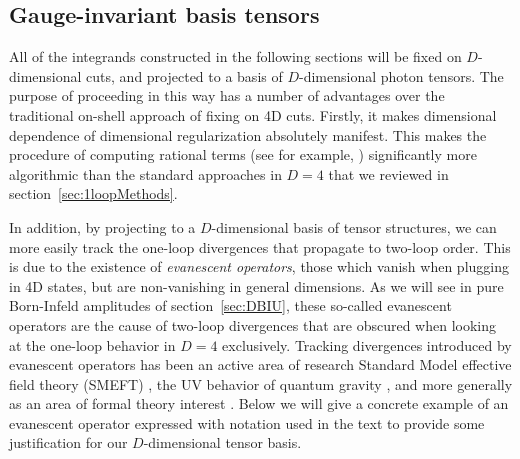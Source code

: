 \documentclass[12pt,letter]{article}
\def\sect#1{section~\ref{#1}}
\def\sec#1{section~\ref{#1}}
\begin{document}
\subsection{Gauge-invariant basis tensors}\label{sec:basisT}
All of the integrands constructed in the following sections will be fixed on $D$-dimensional cuts, and projected to a basis of $D$-dimensional photon tensors. The purpose of proceeding in this way has a number of advantages over the traditional on-shell approach of fixing on 4D cuts. Firstly, it makes dimensional dependence of dimensional regularization absolutely manifest. This makes the procedure of computing rational terms (see for example, \cite{Badger:2008cm}) significantly more algorithmic than the standard approaches in $D=4$ that we reviewed in \sect{sec:1loopMethods}. 

In addition, by projecting to a $D$-dimensional basis of tensor structures, we can more easily track the one-loop divergences that propagate to two-loop order. This is due to the existence of \textit{evanescent operators}, those which vanish when plugging in 4D states, but are non-vanishing in general dimensions. As we will see in pure Born-Infeld amplitudes of \sec{sec:DBIU}, these so-called evanescent operators are the cause of two-loop divergences that are obscured when looking at the one-loop behavior in $D=4$ exclusively. Tracking divergences introduced by evanescent operators has been an active area of research Standard Model effective field theory (SMEFT) \cite{Hartmann:2016pil,Chala:2021cgt,Aebischer:2022tvz,Fuentes-Martin:2022vvu,Isidori:2023pyp}, the UV behavior of quantum gravity \cite{Bern:2015xsa,Bern:2017tuc,Bern:2017puu}, and more generally as an area of formal theory interest \cite{Dugan:1990df,Herrlich:1994kh,Bell:2009nk,Becher:2004kk,DiPietro:2017vsp}. Below we will give a concrete example of an evanescent operator expressed with notation used in the text to provide some justification for our $D$-dimensional tensor basis. 
\end{document}
